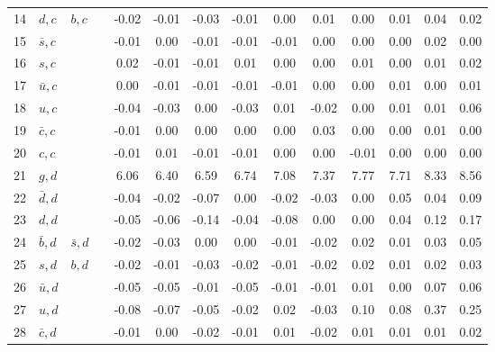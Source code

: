 \begin{tabularx}{\textwidth}{rXXX@{}S@{}S@{}S@{}S@{}S@{}S@{}S@{}S@{}S@{}S}
 14 & $d, c$           & $b, c$            &                  & -0.02 & -0.01 & -0.03 & -0.01 &  0.00 &  0.01 &  0.00 &  0.01 &  0.04 &  0.02 \\
 15 & $\bar s, c$      &                   &                  & -0.01 &  0.00 & -0.01 & -0.01 & -0.01 &  0.00 &  0.00 &  0.00 &  0.02 &  0.00 \\
 16 & $s, c$           &                   &                  &  0.02 & -0.01 & -0.01 &  0.01 &  0.00 &  0.00 &  0.01 &  0.00 &  0.01 &  0.02 \\
 17 & $\bar u, c$      &                   &                  &  0.00 & -0.01 & -0.01 & -0.01 & -0.01 &  0.00 &  0.00 &  0.01 &  0.00 &  0.01 \\
 18 & $u, c$           &                   &                  & -0.04 & -0.03 &  0.00 & -0.03 &  0.01 & -0.02 &  0.00 &  0.01 &  0.01 &  0.06 \\
 19 & $\bar c, c$      &                   &                  & -0.01 &  0.00 &  0.00 &  0.00 &  0.00 &  0.03 &  0.00 &  0.00 &  0.01 &  0.00 \\
 20 & $c, c$           &                   &                  & -0.01 &  0.01 & -0.01 & -0.01 &  0.00 &  0.00 & -0.01 &  0.00 &  0.00 &  0.00 \\
 21 & $g, d$           &                   &                  &  6.06 &  6.40 &  6.59 &  6.74 &  7.08 &  7.37 &  7.77 &  7.71 &  8.33 &  8.56 \\
 22 & $\bar d, d$      &                   &                  & -0.04 & -0.02 & -0.07 &  0.00 & -0.02 & -0.03 &  0.00 &  0.05 &  0.04 &  0.09 \\
 23 & $d, d$           &                   &                  & -0.05 & -0.06 & -0.14 & -0.04 & -0.08 &  0.00 &  0.00 &  0.04 &  0.12 &  0.17 \\
 24 & $\bar b, d$      & $\bar s, d$       &                  & -0.02 & -0.03 &  0.00 &  0.00 & -0.01 & -0.02 &  0.02 &  0.01 &  0.03 &  0.05 \\
 25 & $s, d$           & $b, d$            &                  & -0.02 & -0.01 & -0.03 & -0.02 & -0.01 & -0.02 &  0.02 &  0.01 &  0.02 &  0.03 \\
 26 & $\bar u, d$      &                   &                  & -0.05 & -0.05 & -0.01 & -0.05 & -0.01 & -0.01 &  0.01 &  0.00 &  0.07 &  0.06 \\
 27 & $u, d$           &                   &                  & -0.08 & -0.07 & -0.05 & -0.02 &  0.02 & -0.03 &  0.10 &  0.08 &  0.37 &  0.25 \\
 28 & $\bar c, d$      &                   &                  & -0.01 &  0.00 & -0.02 & -0.01 &  0.01 & -0.02 &  0.01 &  0.01 &  0.01 &  0.02 \\

\end{tabularx}

